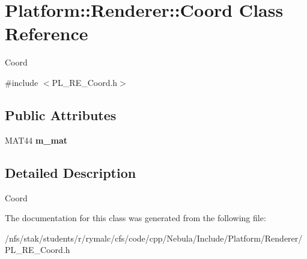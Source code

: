 \hypertarget{classPlatform_1_1Renderer_1_1Coord}{
\section{Platform::Renderer::Coord Class Reference}
\label{classPlatform_1_1Renderer_1_1Coord}
}


Coord  


{\ttfamily \#include $<$PL\_\-RE\_\-Coord.h$>$}\subsection*{Public Attributes}
\begin{DoxyCompactItemize}
\item 
\hypertarget{classPlatform_1_1Renderer_1_1Coord_a850ee240f68d92108a2163f780085a6b}{
MAT44 {\bfseries m\_\-mat}}
\label{classPlatform_1_1Renderer_1_1Coord_a850ee240f68d92108a2163f780085a6b}

\end{DoxyCompactItemize}


\subsection{Detailed Description}
Coord 

The documentation for this class was generated from the following file:\begin{DoxyCompactItemize}
\item 
/nfs/stak/students/r/rymalc/cfs/code/cpp/Nebula/Include/Platform/Renderer/PL\_\-RE\_\-Coord.h\end{DoxyCompactItemize}
